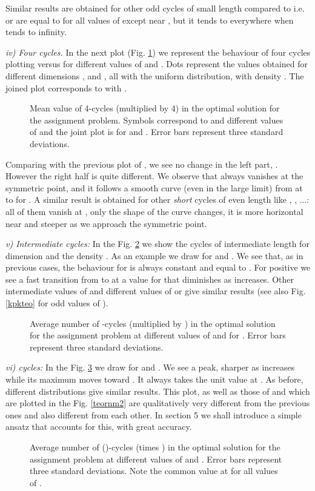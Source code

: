\documentclass[]{iopart}
\begin{document}
Similar results are obtained for other odd cycles
of small length compared to   i.e.  or 
are equal to  for all values of  except
near , but it tends to  everywhere when 
tends to infinity.

{\it iv) Four cycles.}
In the next plot (Fig. \ref{p41}) we represent the behaviour of four cycles
plotting  versus  for different values of  and 
. Dots represent the values obtained for different
dimensions ,  and , 
all with the uniform distribution, with density . 
The joined plot corresponds to  with .
\begin{figure}[h!]
\caption{\small Mean value of  4-cycles (multiplied by 4) in the optimal 
solution for the assignment problem.
Symbols correspond to 
 and different values of  and the joint plot
is for  and .
Error bars represent three standard deviations.}
\label{p41}
\end{figure}


Comparing with the previous plot of , we see no change in the left part,
. However the right half is quite different.
We observe that  always vanishes at the symmetric point, 
and it follows a smooth curve (even in the large  limit)
from  at  to  for . 
A similar result is obtained for other {\it short} cycles of even length
like , , ...:
all of them vanish at , only the shape of the curve
changes, it is more horizontal near  
and steeper as we approach the symmetric point.

{\it v) Intermediate cycles:}
In the Fig. \ref{pk} we show the cycles of intermediate length for dimension 
and the density .
As an example we draw  for  and .
We see that, as in previous cases, the behaviour for  is 
always constant and equal to . For positive  we see
a fast transition from  to  at a value for  that diminishes
as  increases. Other intermediate values of  and different values of  or  
give similar results (see also Fig. \ref{kpkteo} for odd values of ).
\begin{figure}[h!]
\caption{\small Average number of -cycles (multiplied by )
in the optimal solution for the assignment problem at different 
values of  and  for . 
Error bars represent three standard deviations. }
\label{pk}
\end{figure}


{\it vi)  cycles:}
In the Fig. \ref{pnm1} we draw  for 
and . We see a peak, sharper as  increases while
its maximum moves toward . It always takes
the unit value at .
As before, different distributions give similar results.
This plot, as well as those of  and 
which are plotted in the Fig. \ref{teornm2} 
are qualitatively very different from the previous ones
and also different from each other.
In section 5 we shall introduce a simple ansatz that accounts for this,
with great accuracy.
\begin{figure}[h!]
\caption{\small Average number of ()-cycles (times ) 
in the optimal solution for
  the assignment problem at different values of  and  .  Error bars represent three standard deviations. Note the common value  
 at  for all values of .}
\label{pnm1}
\end{figure}
\end{document}
